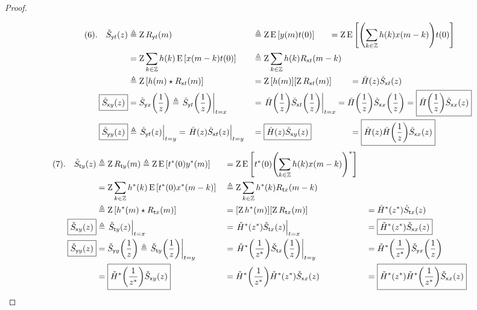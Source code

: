 \begin{proof}
\begin{align*}
\end{align*}
\begin{align*}
   (6).\quad\Szyt(z)
      &\eqd \opZ\Ryt(m)
     &&\eqd \opZ\pE\brs{\rvy(m)\rvt(0)}
       \mathrlap{\qquad
       =    \opZ\pE\brs{\brp{\sum_{k\in\Z} \fh(k) \rvx(m-k)}\rvt(0)}}
    \\&=    \opZ\sum_{k\in\Z} \fh(k) \pE\brs{\rvx(m-k)\rvt(0)}
     &&\eqd \opZ\sum_{k\in\Z} \fh(k) \Rxt(m-k)
    \\&\eqd \opZ\brs{\fh(m) \convd \Rxt(m)}
     &&= \opZ\brs{\fh(m)} \brs{\opZ\Rxt(m)}
     &&= \ZH(z) \Szxt(z)
    \\
    \boxed{\Szxy(z)}
      &= \Szyx\brp{\frac{1}{z}}
       \eqd \brlr{\Szyt\brp{\frac{1}{z}}}_{\rvt=\rvx}
     &&=\mathrlap{ \brlr{\ZH\brp{\frac{1}{z}} \Szxt\brp{\frac{1}{z}}}_{\rvt=\rvx}
       = \ZH\brp{\frac{1}{z}} \Szxx\brp{\frac{1}{z}}
      = \boxed{\ZH\brp{\frac{1}{z}} \Szxx(z)}}
    \\
    \boxed{\Szyy(z)}
      &\eqd \brlr{\Szyt(z)}_{\rvt=\rvy}
       = \brlr{\ZH(z) \Szxt(z)}_{\rvt=\rvy}
     &&= \boxed{\ZH(z) \Szxy(z)}
     &&= \boxed{\ZH(z) \ZH\brp{\frac{1}{z}} \Szxx(z)}
\end{align*}
\begin{align*}
    (7).\quad\check{S}_{{\mathsf ty}}(z)
      &\triangleq \operatorname{Z}R_{{\mathsf ty}}(m)
       \triangleq \operatorname{Z}\operatorname{E}{\left[t^\ast(0)y^\ast(m)\right]}
     &&=    \operatorname{Z}\operatorname{E}{\left[t^\ast(0){\left(\sum_{k\in\mathbb{Z}} {h}(k) x(m-k)\right)}^\ast\right]}
    \\&=    \operatorname{Z}                    \sum_{k\in\mathbb{Z}} {h}^\ast(k) \operatorname{E}{\left[t^\ast(0)x^\ast(m-k)\right]}
     &&\triangleq \operatorname{Z}                    \sum_{k\in\mathbb{Z}} {h}^\ast(k) R_{{\mathsf tx}}(m-k)
    \\&\triangleq \operatorname{Z}{\left[{h}^\ast(m) \star R_{{\mathsf tx}}(m)\right]}
     &&= {\left[\operatorname{Z}{h}^\ast(m)\right]} {\left[\operatorname{Z}R_{{\mathsf tx}}(m)\right]}
     &&= {{\check{{H}}}}^\ast{\left(z^\ast\right)} \check{S}_{{\mathsf tx}}(z)
    \\
    \boxed{\check{S}_{{\mathsf xy}}(z)}
      &\triangleq \left.\check{S}_{{\mathsf ty}}(z)\right|_{t=x}
     &&= \left.{{\check{{H}}}}^\ast{\left(z^\ast\right)} \check{S}_{{\mathsf tx}}(z)\right|_{t=x}
     &&= \boxed{{{\check{{H}}}}^\ast{\left(z^\ast\right)} \check{S}_{{\mathsf xx}}(z)}
    \\
    \boxed{\check{S}_{{\mathsf yy}}(z)}
      &= \check{S}_{{\mathsf yy}}{\left(\frac{1}{z}\right)}
      \triangleq \left.\check{S}_{{\mathsf ty}}{\left(\frac{1}{z}\right)}\right|_{t=y}
     &&= \left.{{\check{{H}}}}^\ast{\left(\frac{1}{z^\ast}\right)} \check{S}_{{\mathsf tx}}{\left(\frac{1}{z}\right)}\right|_{t=y}
     &&= {{\check{{H}}}}^\ast{\left(\frac{1}{z^\ast}\right)} \check{S}_{{\mathsf yx}}{\left(\frac{1}{z}\right)}
    \\&= \boxed{{{\check{{H}}}}^\ast{\left(\frac{1}{z^\ast}\right)} \check{S}_{{\mathsf xy}}(z)}
     &&= {{\check{{H}}}}^\ast{\left(\frac{1}{z^\ast}\right)} {{\check{{H}}}}^\ast{\left(z^\ast\right)} \check{S}_{{\mathsf xx}}(z)
     &&= \boxed{ {{\check{{H}}}}^\ast{\left(z^\ast\right)} {{\check{{H}}}}^\ast{\left(\frac{1}{z^\ast}\right)}\check{S}_{{\mathsf xx}}(z)}
\end{align*}

\end{proof}
